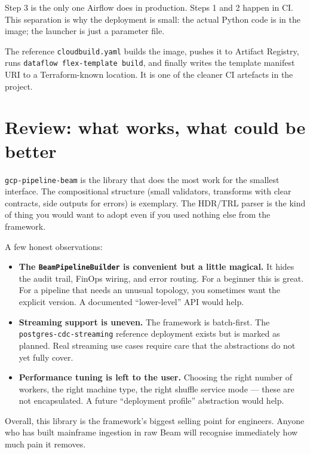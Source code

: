 \documentclass[
  11pt,
  british,
  oneside]{book}
\providecommand{\tightlist}{%
  \setlength{\itemsep}{0pt}\setlength{\parskip}{0pt}}
\begin{document}
Step 3 is the only one Airflow does in production. Steps 1 and 2 happen
in CI. This separation is why the deployment is small: the actual Python
code is in the image; the launcher is just a parameter file.

The reference \texttt{cloudbuild.yaml} builds the image, pushes it to
Artifact Registry, runs \texttt{dataflow\ flex-template\ build}, and
finally writes the template manifest URI to a Terraform-known location.
It is one of the cleaner CI artefacts in the project.

\hypertarget{review-what-works-what-could-be-better-1}{%
\section{Review: what works, what could be
better}\label{review-what-works-what-could-be-better-1}}

\texttt{gcp-pipeline-beam} is the library that does the most work for
the smallest interface. The compositional structure (small validators,
transforms with clear contracts, side outputs for errors) is exemplary.
The HDR/TRL parser is the kind of thing you would want to adopt even if
you used nothing else from the framework.

A few honest observations:

\begin{itemize}
\tightlist
\item
  \textbf{The \texttt{BeamPipelineBuilder} is convenient but a little
  magical.} It hides the audit trail, FinOps wiring, and error routing.
  For a beginner this is great. For a pipeline that needs an unusual
  topology, you sometimes want the explicit version. A documented
  ``lower-level'' API would help.
\item
  \textbf{Streaming support is uneven.} The framework is batch-first.
  The \texttt{postgres-cdc-streaming} reference deployment exists but is
  marked as planned. Real streaming use cases require care that the
  abstractions do not yet fully cover.
\item
  \textbf{Performance tuning is left to the user.} Choosing the right
  number of workers, the right machine type, the right shuffle service
  mode --- these are not encapsulated. A future ``deployment profile''
  abstraction would help.
\end{itemize}

Overall, this library is the framework's biggest selling point for
engineers. Anyone who has built mainframe ingestion in raw Beam will
recognise immediately how much pain it removes.
\end{document}
